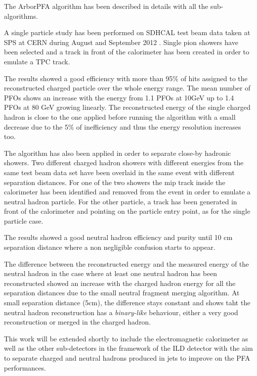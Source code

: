 \documentclass[cits]{JINST}
\begin{document}
The ArborPFA algorithm has been described in details with all the sub-algorithms. 

A single particle study has been performed on SDHCAL test beam data taken at SPS at CERN during August and September 2012 \cite{sdhcal-paper}. Single pion showers have been selected and a track in front of the calorimeter has been created in order to emulate a TPC track.

The results showed a good efficiency with more than 95\% of hits assigned to the reconstructed charged particle over the whole energy range. The mean number of PFOs shows an increase with the energy from 1.1 PFOs at 10GeV up to 1.4 PFOs at 80 GeV growing linearly. The reconstructed energy of the single charged hadron is close to the one applied before running the algorithm with a small decrease due to the 5\% of inefficiency and thus the energy resolution increases too.

The algorithm has also been applied in order to separate close-by hadronic showers. Two different charged hadron showers with different energies from the same test beam data set have been overlaid in the same event with different separation distances. For one of the two showers the mip track inside the calorimeter has been identified and removed from the event in order to emulate a neutral hadron particle. For the other particle, a track has been generated in front of the calorimeter and pointing on the particle entry point, as for the single particle case. 

The results showed a good neutral hadron efficiency and purity until 10 cm separation distance where a non negligible confusion starts to appear. 

The difference between the reconstructed energy and the measured energy of the neutral hadron in the case where at least one neutral hadron has been reconstructed showed an increase with the charged hadron energy for all the separation distances due to the small neutral fragment merging algorithm. At small separation distance (5cm), the difference stays constant and shows taht the neutral hadron reconstruction has a \textit{binary-like} behaviour, either a very good reconstruction or merged in the charged hadron.

This work will be extended shortly to include the electromagnetic calorimeter as well as the other sub-detectors in the framework of the ILD detector with the aim to separate charged and neutral hadrons produced in jets to improve on the PFA performances.
\end{document}
